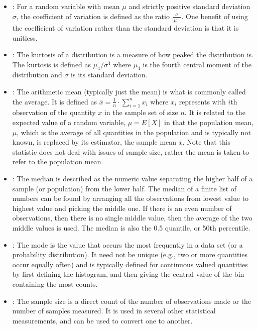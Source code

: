 \documentclass[draftspec]{sbmlpkgspec}
\begin{document}
\begin{itemize}

\item {}:  For a random variable with mean $ \mu $ and strictly positive standard deviation $ \sigma $, the coefficient of variation is defined as the ratio $ \frac{\sigma}{\mid\mu\mid} $. One benefit of using the coefficient of variation rather than the standard deviation is that it is unitless.

\item {}:  The kurtosis of a distribution is a measure of how peaked the distribution is. The kurtosis is defined as $ \mu_4/\sigma^4 $ where $ \mu_4 $ is the fourth central moment of the distribution and $ \sigma $ is its standard deviation.

\item {}:  The arithmetic mean (typically just the mean) is what is commonly called the average. It is defined as $ \bar{x} = \frac{1}{n}\cdot \sum_{i=1}^n{x_i} $ where $ x_i $ represents with $ i $th observation of the quantity $ x $ in the sample set of size $ n $. It is related to the expected value of a random variable, $ \mu = E[X] $ in that the population mean, $ \mu $, which is the average of all quantities in the population and is typically not known, is replaced by its estimator, the sample mean $ \bar{x} $. Note that this statistic does not deal with issues of sample size, rather the mean is taken to refer to the population mean.

\item {}:  The median is described as the numeric value separating the higher half of a sample (or population) from the lower half. The median of a finite list of numbers can be found by arranging all the observations from lowest value to highest value and picking the middle one. If there is an even number of observations, then there is no single middle value, then the average of the two middle values is used. The median is also the 0.5 quantile, or 50th percentile.

\item {}:  The mode is the value that occurs the most frequently in a data set (or a probability distribution). It need not be unique (e.g., two or more quantities occur equally often) and is typically defined for continuous valued quantities by first defining the histogram, and then giving the central value of the bin containing the most counts.

\item {}:  The sample size is a direct count of the number of observations made or the number of samples measured.  It is used in several other statistical measurements, and can be used to convert one to another.


\end{itemize}
\end{document}
